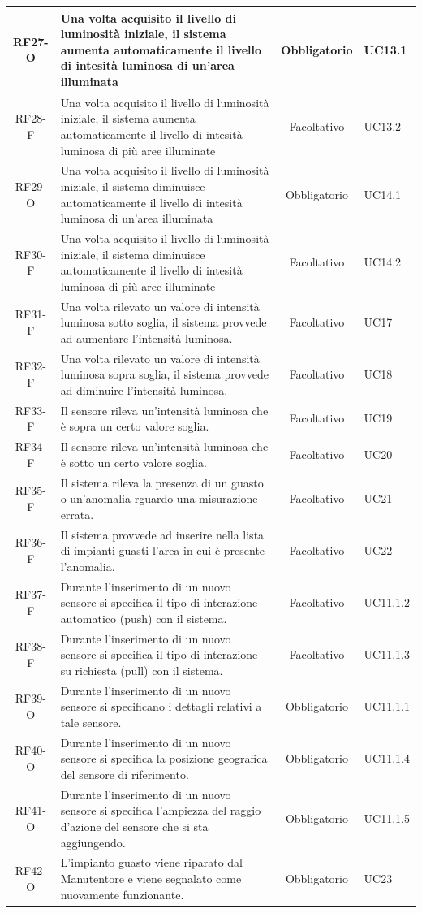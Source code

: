 \documentclass[a4paper, 12pt]{article}
\begin{document}
\begin{longtable}{|c|p{7cm}|c|p{4cm}|}
    \hline
    RF27-O & Una volta acquisito il livello di luminosità iniziale, il sistema aumenta automaticamente il livello di intesità luminosa di un'area illuminata & Obbligatorio & UC13.1 \\
    \hline
    RF28-F & Una volta acquisito il livello di luminosità iniziale, il sistema aumenta automaticamente il livello di intesità luminosa di più aree illuminate & Facoltativo & UC13.2 \\
    \hline
    RF29-O & Una volta acquisito il livello di luminosità iniziale, il sistema diminuisce automaticamente il livello di intesità luminosa di un'area illuminata & Obbligatorio & UC14.1 \\
    \hline
    RF30-F & Una volta acquisito il livello di luminosità iniziale, il sistema diminuisce automaticamente il livello di intesità luminosa di più aree illuminate & Facoltativo & UC14.2 \\
    \hline
    RF31-F & Una volta rilevato un valore di intensità luminosa sotto soglia, il sistema provvede ad aumentare l'intensità luminosa. & Facoltativo & UC17\\
    \hline
    RF32-F & Una volta rilevato un valore di intensità luminosa sopra soglia, il sistema provvede ad diminuire l'intensità luminosa. & Facoltativo & UC18\\
    \hline
    RF33-F & Il sensore rileva un'intensità luminosa che è sopra un certo valore soglia. & Facoltativo & UC19\\
    \hline
    RF34-F & Il sensore rileva un'intensità luminosa che è sotto un certo valore soglia. & Facoltativo & UC20\\
    \hline
    RF35-F & Il sistema rileva la presenza di un guasto o un'anomalia rguardo una misurazione errata. & Facoltativo & UC21\\
    \hline
    RF36-F & Il sistema provvede ad inserire nella lista di impianti guasti l'area in cui è presente l'anomalia. & Facoltativo & UC22\\    
    \hline
    RF37-F & Durante l'inserimento di un nuovo sensore si specifica il tipo di interazione automatico (push) con il sistema. & Facoltativo & UC11.1.2\\
    \hline
    RF38-F & Durante l'inserimento di un nuovo sensore si specifica il tipo di interazione su richiesta (pull) con il sistema. & Facoltativo & UC11.1.3\\
    \hline
    RF39-O & Durante l'inserimento di un nuovo sensore si specificano i dettagli relativi a tale sensore. & Obbligatorio & UC11.1.1\\
    \hline
    RF40-O & Durante l'inserimento di un nuovo sensore si specifica la posizione geografica del sensore di riferimento. & Obbligatorio & UC11.1.4\\
    \hline
    RF41-O & Durante l'inserimento di un nuovo sensore si specifica l'ampiezza del raggio d'azione del sensore che si sta aggiungendo. & Obbligatorio & UC11.1.5\\
    \hline
    RF42-O & L'impianto guasto viene riparato dal Manutentore e viene segnalato come nuovamente funzionante. & Obbligatorio & UC23\\


\end{longtable}
\end{document}

